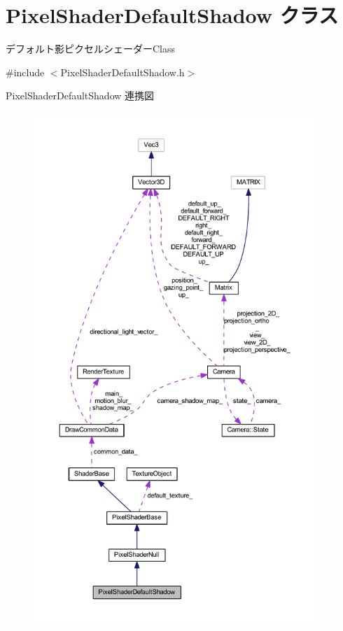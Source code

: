 \hypertarget{class_pixel_shader_default_shadow}{}\section{Pixel\+Shader\+Default\+Shadow クラス}
\label{class_pixel_shader_default_shadow}


デフォルト影ピクセルシェーダー\+Class  




{\ttfamily \#include $<$Pixel\+Shader\+Default\+Shadow.\+h$>$}



Pixel\+Shader\+Default\+Shadow 連携図\nopagebreak
\begin{figure}[H]
\begin{center}
\leavevmode
\includegraphics[height=550pt]{class_pixel_shader_default_shadow__coll__graph}
\end{center}
\end{figure}
